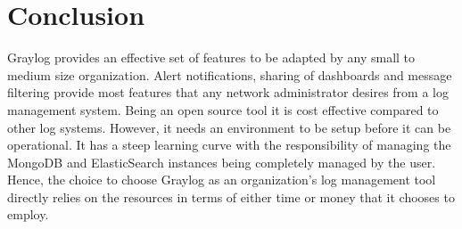 \documentclass[9pt,twocolumn,twoside]{styles/osajnl}
\begin{document}
\section{Conclusion}
Graylog provides an effective set of features to be adapted by any
small to medium size organization. Alert notifications, sharing of
dashboards and message filtering provide most features that any
network administrator desires from a log management system. Being an
open source tool it is cost effective compared to other log
systems. However, it needs an environment to be setup before it can be
operational. It has a steep learning curve with the responsibility of
managing the MongoDB and ElasticSearch instances being completely
managed by the user.  Hence, the choice to choose Graylog as an
organization's log management tool directly relies on the resources
in terms of either time or money that it chooses to employ.




\end{document}
